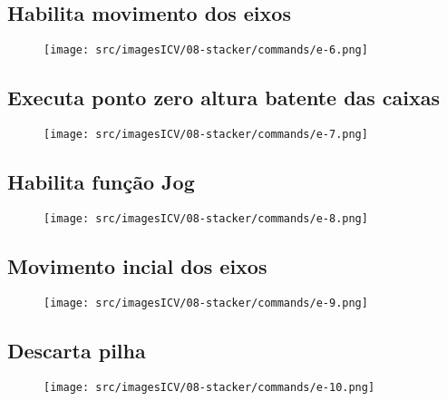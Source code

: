 \newpage
\thispagestyle{fancy}
\vspace{\fill}
\subsection{\small Habilita movimento dos eixos}
\begin{figure}
    \centering
    \texttt{[image: src/imagesICV/08-stacker/commands/e-6.png]}
\end{figure}

\newpage
\thispagestyle{fancy}
\vspace{\fill}
\subsection{\small Executa ponto zero altura batente das caixas}
\begin{figure}
    \centering
    \texttt{[image: src/imagesICV/08-stacker/commands/e-7.png]}
\end{figure}

\newpage
\thispagestyle{fancy}
\vspace{\fill}
\subsection{\small Habilita função Jog}
\begin{figure}
    \centering
    \texttt{[image: src/imagesICV/08-stacker/commands/e-8.png]}
\end{figure}

\newpage
\thispagestyle{fancy}
\vspace{\fill}
\subsection{\small Movimento incial dos eixos}
\begin{figure}
    \centering
    \texttt{[image: src/imagesICV/08-stacker/commands/e-9.png]}
\end{figure}

\newpage
\thispagestyle{fancy}
\vspace{\fill}
\subsection{\small Descarta pilha}
\begin{figure}
    \centering
    \texttt{[image: src/imagesICV/08-stacker/commands/e-10.png]}
\end{figure}


